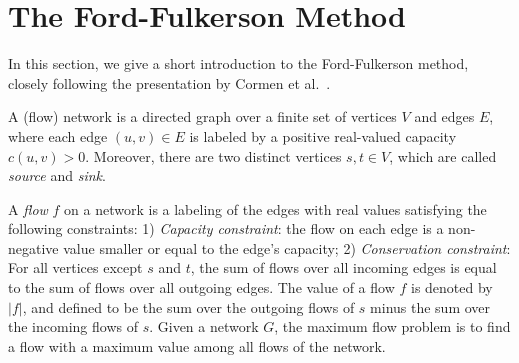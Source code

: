 \documentclass[smallcondensed]{svjour3}     %
\begin{document}
\section{The Ford-Fulkerson Method}\label{sec:background}
%       
%   
% 
%         
%   
%   
%   
%   
%   

In this section, we give a short introduction to the Ford-Fulkerson method, closely following the presentation by Cormen et al.~\cite{CLRS09}.

% 

A (flow) network is a directed graph over a finite set of vertices $V$ and edges $E$, where each edge $(u,v)\in E$ is labeled by a positive real-valued capacity $c(u,v)>0$.
Moreover, there are two distinct vertices $s,t\in V$, which are called \emph{source} and \emph{sink}. 

A \emph{flow} $f$ on a network is a labeling of the edges with real values satisfying the following constraints: 1) \emph{Capacity constraint}: the flow on each edge is a non-negative value smaller or equal to the edge's capacity; 2) \emph{Conservation constraint}: For all vertices except $s$ and $t$, the sum of flows over all incoming edges is equal to the sum of flows over all outgoing edges. 
The value of a flow $f$ is denoted by $|f|$, and defined to be the sum over the outgoing flows of $s$ minus the sum over the incoming flows of $s$.
Given a network $G$, the maximum flow problem is to find a flow with a maximum value among all flows of the network. 
\end{document}
